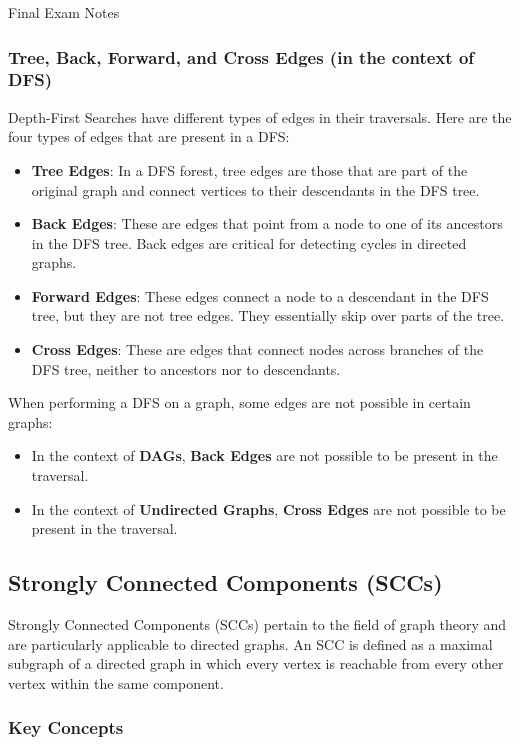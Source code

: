 \begin{examnotes}{Final Exam Notes}
    \subsubsection*{Tree, Back, Forward, and Cross Edges (in the context of DFS)}

    Depth-First Searches have different types of edges in their traversals. Here are the four types of edges that are present in a DFS:

    \begin{itemize}
        \item \textbf{Tree Edges}: In a DFS forest, tree edges are those that are part of the original graph and connect vertices to their descendants in the DFS tree.
        \item \textbf{Back Edges}: These are edges that point from a node to one of its ancestors in the DFS tree. Back edges are critical for detecting cycles in directed graphs.
        \item \textbf{Forward Edges}: These edges connect a node to a descendant in the DFS tree, but they are not tree edges. They essentially skip over parts of the tree.
        \item \textbf{Cross Edges}: These are edges that connect nodes across branches of the DFS tree, neither to ancestors nor to descendants.
    \end{itemize}
    When performing a DFS on a graph, some edges are not possible in certain graphs:

    \begin{itemize}
        \item In the context of \textbf{DAGs}, \textbf{Back Edges} are not possible to be present in the traversal.
        \item In the context of \textbf{Undirected Graphs}, \textbf{Cross Edges} are not possible to be present in the traversal.
    \end{itemize}

    \subsection*{Strongly Connected Components (SCCs)}

    Strongly Connected Components (SCCs) pertain to the field of graph theory and are particularly applicable to directed graphs. An SCC is defined as a maximal subgraph of a directed graph in which 
    every vertex is reachable from every other vertex within the same component.

    \subsubsection*{Key Concepts}


\end{examnotes}

